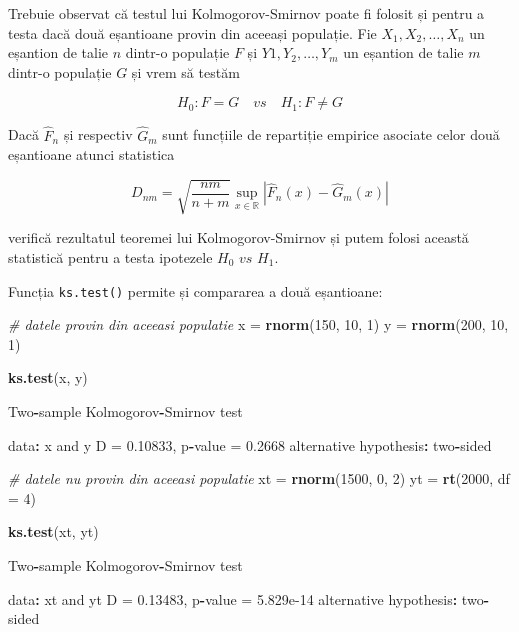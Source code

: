 \documentclass[]{article}
\newenvironment{Shaded}{\begin{snugshade}}{\end{snugshade}}
\newcommand{\KeywordTok}[1]{\textcolor[rgb]{0.13,0.29,0.53}{\textbf{#1}}}
\newcommand{\DataTypeTok}[1]{\textcolor[rgb]{0.13,0.29,0.53}{#1}}
\newcommand{\DecValTok}[1]{\textcolor[rgb]{0.00,0.00,0.81}{#1}}
\newcommand{\FloatTok}[1]{\textcolor[rgb]{0.00,0.00,0.81}{#1}}
\newcommand{\StringTok}[1]{\textcolor[rgb]{0.31,0.60,0.02}{#1}}
\newcommand{\CommentTok}[1]{\textcolor[rgb]{0.56,0.35,0.01}{\textit{#1}}}
\newcommand{\OperatorTok}[1]{\textcolor[rgb]{0.81,0.36,0.00}{\textbf{#1}}}
\newcommand{\NormalTok}[1]{#1}
\begin{document}
Trebuie observat că testul lui Kolmogorov-Smirnov poate fi folosit și
pentru a testa dacă două eșantioane provin din aceeași populație. Fie
\(X_1, X_2, \ldots, X_n\) un eșantion de talie \(n\) dintr-o populație
\(F\) și \(Y1, Y_2, \ldots, Y_m\) un eșantion de talie \(m\) dintr-o
populație \(G\) și vrem să testăm

\[
  H_0: F = G \quad vs\quad H_1: F\neq G
\]

Dacă \(\hat{F}_n\) și respectiv \(\hat{G}_m\) sunt funcțiile de
repartiție empirice asociate celor două eșantioane atunci statistica

\[
  D_{nm} = \sqrt{\frac{nm}{n+m}}\sup_{x\in\mathbb{R}}\left|\hat{F}_n(x) - \hat{G}_m(x)\right|
\]

verifică rezultatul teoremei lui Kolmogorov-Smirnov și putem folosi
această statistică pentru a testa ipotezele \(H_0\,\, vs\,\, H_1\).

Funcția \texttt{ks.test()} permite și compararea a două eșantioane:

\begin{Shaded}
\begin{Highlighting}[]
\CommentTok{# datele provin din aceeasi populatie}
\NormalTok{x =}\StringTok{ }\KeywordTok{rnorm}\NormalTok{(}\DecValTok{150}\NormalTok{, }\DecValTok{10}\NormalTok{, }\DecValTok{1}\NormalTok{)}
\NormalTok{y =}\StringTok{ }\KeywordTok{rnorm}\NormalTok{(}\DecValTok{200}\NormalTok{, }\DecValTok{10}\NormalTok{, }\DecValTok{1}\NormalTok{)}

\KeywordTok{ks.test}\NormalTok{(x, y)}

\NormalTok{    Two}\OperatorTok{-}\NormalTok{sample Kolmogorov}\OperatorTok{-}\NormalTok{Smirnov test}

\NormalTok{data}\OperatorTok{:}\StringTok{  }\NormalTok{x and y}
\NormalTok{D =}\StringTok{ }\FloatTok{0.10833}\NormalTok{, p}\OperatorTok{-}\NormalTok{value =}\StringTok{ }\FloatTok{0.2668}
\NormalTok{alternative hypothesis}\OperatorTok{:}\StringTok{ }\NormalTok{two}\OperatorTok{-}\NormalTok{sided}

\CommentTok{# datele nu provin din aceeasi populatie}
\NormalTok{xt =}\StringTok{ }\KeywordTok{rnorm}\NormalTok{(}\DecValTok{1500}\NormalTok{, }\DecValTok{0}\NormalTok{, }\DecValTok{2}\NormalTok{)}
\NormalTok{yt =}\StringTok{ }\KeywordTok{rt}\NormalTok{(}\DecValTok{2000}\NormalTok{, }\DataTypeTok{df =} \DecValTok{4}\NormalTok{)}

\KeywordTok{ks.test}\NormalTok{(xt, yt)}

\NormalTok{    Two}\OperatorTok{-}\NormalTok{sample Kolmogorov}\OperatorTok{-}\NormalTok{Smirnov test}

\NormalTok{data}\OperatorTok{:}\StringTok{  }\NormalTok{xt and yt}
\NormalTok{D =}\StringTok{ }\FloatTok{0.13483}\NormalTok{, p}\OperatorTok{-}\NormalTok{value =}\StringTok{ }\FloatTok{5.829e-14}
\NormalTok{alternative hypothesis}\OperatorTok{:}\StringTok{ }\NormalTok{two}\OperatorTok{-}\NormalTok{sided}
\end{Highlighting}
\end{Shaded}
\end{document}
